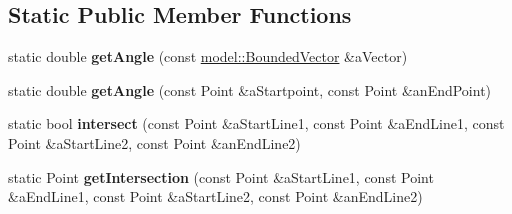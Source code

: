 \subsection*{Static Public Member Functions}
\begin{DoxyCompactItemize}
\item 
static double {\bfseries get\+Angle} (const \hyperlink{class_model_1_1_bounded_vector}{model\+::\+Bounded\+Vector} \&a\+Vector)\hypertarget{class_utils_1_1_shape2_d_utils_a0a6d71335cddbfb02f15603a9594f3e7}{}\label{class_utils_1_1_shape2_d_utils_a0a6d71335cddbfb02f15603a9594f3e7}

\item 
static double {\bfseries get\+Angle} (const Point \&a\+Startpoint, const Point \&an\+End\+Point)\hypertarget{class_utils_1_1_shape2_d_utils_a4d91eeb6e08a2116209b69ec75bc8966}{}\label{class_utils_1_1_shape2_d_utils_a4d91eeb6e08a2116209b69ec75bc8966}

\item 
static bool {\bfseries intersect} (const Point \&a\+Start\+Line1, const Point \&a\+End\+Line1, const Point \&a\+Start\+Line2, const Point \&an\+End\+Line2)\hypertarget{class_utils_1_1_shape2_d_utils_a404882ff5a44d0cfa6500941c4b925f5}{}\label{class_utils_1_1_shape2_d_utils_a404882ff5a44d0cfa6500941c4b925f5}

\item 
static Point {\bfseries get\+Intersection} (const Point \&a\+Start\+Line1, const Point \&a\+End\+Line1, const Point \&a\+Start\+Line2, const Point \&an\+End\+Line2)\hypertarget{class_utils_1_1_shape2_d_utils_a0c1b1443dbc38bac0178ef9240270a9d}{}\label{class_utils_1_1_shape2_d_utils_a0c1b1443dbc38bac0178ef9240270a9d}


\end{DoxyCompactItemize}

